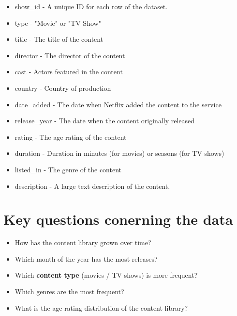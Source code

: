 \documentclass[12pt]{report}\usepackage[]{graphicx}\usepackage[]{xcolor}
\begin{document}
    \begin{itemize}
        \item show\_id - A unique ID for each row of the dataset.
        \item type - "Movie" or "TV Show"
        \item title - The title of the content
        \item director - The director of the content
        \item cast - Actors featured in the content
        \item country - Country of production
        \item date\_added - The date when Netflix added the content to the service
        \item release\_year - The date when the content originally released
        \item rating - The age rating of the content
        \item duration - Duration in minutes (for movies) or seasons (for TV shows)
        \item listed\_in - The genre of the content
        \item description - A large text description of the content.
    \end{itemize}


    \section{Key questions conerning the data}
    \begin{itemize}
        \item How has the content library grown over time?
        \item Which month of the year has the most releases?
        \item Which \textbf{content type} (movies / TV shows) is more frequent?
        \item Which genres are the most frequent?
        \item What is the age rating distribution of the content library?
    \end{itemize}
\end{document}

